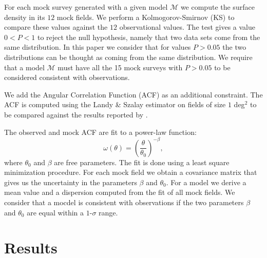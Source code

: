 \documentclass{emulateapj}
\begin{document}
For each mock survey generated with a given model ${\mathcal M}$ we
compute the surface density in its $12$ mock fields. We perform a
Kolmogorov-Smirnov (KS) to compare these values against the $12$
observational values. The test gives a value $0<P<1$ to
reject the null hypothesis, namely that two data sets come from the
same distribution. In this paper we consider that for values $P>0.05$
the two distributions can be thought as coming from the same
distribution. We require that a model ${\mathcal M}$ must have all the 15 mock
surveys with $P>0.05$ to be considered consistent with observations.


We add the Angular Correlation Function (ACF) as an additional
constraint. The ACF is computed using  the Landy \&  Szalay estimator
  \citep{Landy1993}  on fields of size $1$ deg$^2$ to be compared
  against the results reported by \cite{Ouchi2010}.

The observed and mock ACF are fit to a power-law function:
\begin{equation}
\omega(\theta) = \left(\frac{\theta}{\theta_{0}}\right)^{-\beta}, 
\label{eq:fitting}
\end{equation}
%
where $\theta_0$ and $\beta$ are free parameters. The fit is done
using a least square minimization procedure. For each mock field we
obtain a covariance matrix that gives us the uncertainty in the
parameters $\beta$ and $\theta_0$.  For a model we derive a mean
value and a dispersion computed from the fit of all mock fields. We
consider that a mocdel is consistent with observations if the two
parameters $\beta$ and $\theta_0$ are equal within a $1$-$\sigma$
range. 

 
\section{Results}
\label{sec:results}
\end{document}
